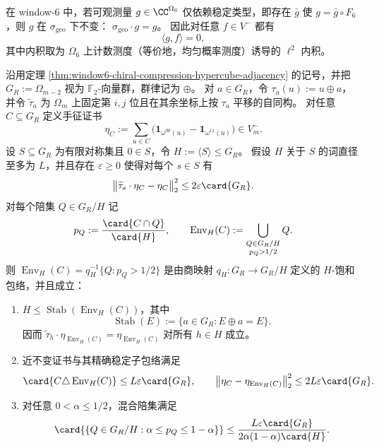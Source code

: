 \begin{proposition}[手征扇区对稳定类型可观测量的严格正交性]\label{prop:window6-chiral-orthogonality-to-type-observables}
在 window-\(6\) 中，若可观测量 \(g\in\CC^{\Omega_6}\) 仅依赖稳定类型，即存在 \(\bar g\) 使 \(g=\bar g\circ F_6\)，则 \(g\) 在 \(\sigma_{\mathrm{geo}}\) 下不变：
\(
\sigma_{\mathrm{geo}}\cdot g=g
\)。
因此对任意 \(f\in V^-\) 都有
\[
\langle g,f\rangle=0,
\]
其中内积取为 \(\Omega_6\) 上计数测度（等价地，均匀概率测度）诱导的 \(\ell^2\) 内积。
\end{proposition}
\begin{theorem}\label{distill:hrushovski_zilber_zariski_geometries_and_elekes_szabo_group_extraction-definable_envelope_and_stabilizer_theorem_schema-window6-chiral-coset-envelope-stabilizer}
沿用定理 \ref{thm:window6-chiral-compression-hypercube-adjacency} 的记号，并把
\(G_R:=\Omega_{m-2}\) 视为 \(\mathbb F_2\)-向量群，群律记为 \(\oplus\)。
对 \(a\in G_R\)，令 \(\tau_a(u):=u\oplus a\)，并令 \(\widetilde\tau_a\) 为 \(\Omega_m\) 上固定第 \(i,j\) 位且在其余坐标上按 \(\tau_a\) 平移的自同构。
对任意 \(C\subseteq G_R\) 定义手征证书
\[
\eta_C:=\sum_{u\in C}\bigl(\mathbf 1_{\omega^{00}(u)}-\mathbf 1_{\omega^{11}(u)}\bigr)\in V_m^- .
\]
设 \(S\subseteq G_R\) 为有限对称集且 \(0\in S\)，令 \(H:=\langle S\rangle\le G_R\)。
假设 \(H\) 关于 \(S\) 的词直径至多为 \(L\)，并且存在 \(\varepsilon\ge0\) 使得对每个 \(s\in S\) 有
\[
\bigl\|\widetilde\tau_s\cdot\eta_C-\eta_C\bigr\|_2^2\le 2\varepsilon\card{G_R}.
\]
对每个陪集 \(Q\in G_R/H\) 记
\[
p_Q:=\frac{\card{C\cap Q}}{\card{H}},
\qquad
\operatorname{Env}_H(C):=\bigcup_{\substack{Q\in G_R/H\\ p_Q>1/2}}Q.
\]
则 \(\operatorname{Env}_H(C)=q_H^{-1}\{Q:p_Q>1/2\}\) 是由商映射 \(q_H:G_R\to G_R/H\) 定义的 \(H\)-饱和包络，并且成立：
\begin{enumerate}
  \item \(H\le \operatorname{Stab}(\operatorname{Env}_H(C))\)，其中
  \[
  \operatorname{Stab}(E):=\{a\in G_R:E\oplus a=E\}.
  \]
  因而 \(\widetilde\tau_h\cdot\eta_{\operatorname{Env}_H(C)}=\eta_{\operatorname{Env}_H(C)}\) 对所有 \(h\in H\) 成立。
  \item 近不变证书与其精确稳定子包络满足
  \[
  \card{C\triangle \operatorname{Env}_H(C)}\le L\varepsilon\card{G_R},
  \qquad
  \bigl\|\eta_C-\eta_{\operatorname{Env}_H(C)}\bigr\|_2^2\le 2L\varepsilon\card{G_R}.
  \]
  \item 对任意 \(0<\alpha\le1/2\)，混合陪集满足
  \[
  \card{\{Q\in G_R/H:\alpha\le p_Q\le1-\alpha\}}
  \le
  \frac{L\varepsilon\card{G_R}}{2\alpha(1-\alpha)\card{H}}.
  \]
\end{enumerate}
\end{theorem}
